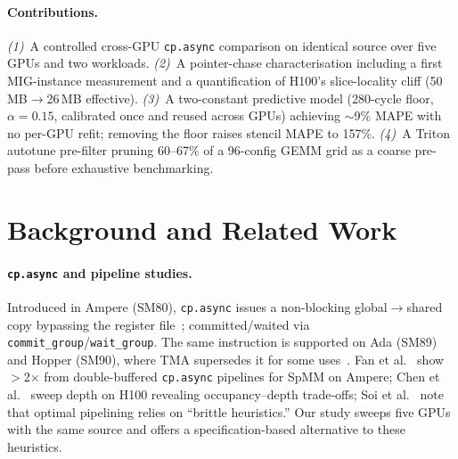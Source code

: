 \documentclass[10pt,twocolumn]{article}
\newcommand{\cpasync}{\texttt{cp.async}}
\begin{document}
\paragraph{Contributions.}
\emph{(1)}~A controlled cross-GPU \cpasync{} comparison on identical
source over five GPUs and two workloads.
\emph{(2)}~A pointer-chase characterisation including a first
MIG-instance measurement and a quantification of H100's
slice-locality cliff (50\,MB$\to$26\,MB effective).
\emph{(3)}~A two-constant predictive model (280-cycle floor,
$\alpha{=}0.15$, calibrated once and reused across GPUs) achieving
$\sim$9\% MAPE with no per-GPU refit; removing the floor raises
stencil MAPE to 157\%.
\emph{(4)}~A Triton autotune pre-filter pruning 60--67\% of a
96-config GEMM grid as a coarse pre-pass before exhaustive
benchmarking.

\section{Background and Related Work}
\label{sec:related}

\paragraph{\cpasync{} and pipeline studies.}
Introduced in Ampere (SM80), \cpasync{} issues a non-blocking
global$\to$shared copy bypassing the register file~\cite{cuda_guide};
committed/waited via \texttt{commit\_group}/\texttt{wait\_group}.
The same instruction is supported on Ada (SM89) and Hopper (SM90),
where TMA supersedes it for some uses~\cite{hopper_ieee,hopper_microbench}.
Fan et al.~\cite{dtcspmm} show $>$2$\times$ from double-buffered
\cpasync{} pipelines for SpMM on Ampere; Chen et al.~\cite{tawa}
sweep depth on H100 revealing occupancy--depth trade-offs; Soi et
al.~\cite{twill} note that optimal pipelining relies on ``brittle
heuristics.''  Our study sweeps five GPUs with the same source and
offers a specification-based alternative to these heuristics.
\end{document}
